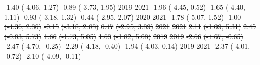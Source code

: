 \documentclass[
  letterpaper,
  DIV=11,
  numbers=noendperiod]{scrartcl}
\providecommand{\DIFdeltex}[1]{{\protect\color{red}\sout{#1}}}                      %
\providecommand{\DIFdelFL}[1]{\DIFdel{#1}} %
\providecommand{\DIFdel}[1]{\texorpdfstring{\DIFdeltex{#1}}{}} %
\begin{document}
\DIFdelFL{-1.40 }%
\DIFdelFL{(-4.06, 1.27) }%
\DIFdelFL{-0.89 }%
\DIFdelFL{(-3.73, 1.95)}%
\DIFdelFL{\hspace{1em}2019 }%
\DIFdelFL{2021 }%
\DIFdelFL{-1.96 }%
\DIFdelFL{(-4.45, 0.52) }%
\DIFdelFL{-1.65 }%
\DIFdelFL{(-4.40, 1.11) }%
\DIFdelFL{-0.93 }%
\DIFdelFL{(-3.18, 1.32) }%
\DIFdelFL{-0.44 }%
\DIFdelFL{(-2.95, 2.07)}%
\DIFdelFL{\hspace{1em}2020 }%
\DIFdelFL{2021 }%
\DIFdelFL{-1.78 }%
\DIFdelFL{(-5.07, 1.52) }%
\DIFdelFL{-1.00 }%
\DIFdelFL{(-4.36, 2.36) }%
\DIFdelFL{-0.15 }%
\DIFdelFL{(-3.18, 2.88) }%
\DIFdelFL{0.47 }%
\DIFdelFL{(-2.95, 3.89)}%
\DIFdelFL{\hspace{1em}2021 }%
\DIFdelFL{2021 }%
\DIFdelFL{2.11 }%
\DIFdelFL{(-1.09, 5.31) }%
\DIFdelFL{2.45 }%
\DIFdelFL{(-0.83, 5.73) }%
\DIFdelFL{1.66 }%
\DIFdelFL{(-1.73, 5.05) }%
\DIFdelFL{1.63 }%
\DIFdelFL{(-1.82, 5.08)}%
\DIFdelFL{\hspace{1em}2019 }%
\DIFdelFL{2019 }%
\DIFdelFL{-2.66 }%
\DIFdelFL{(-4.67, -0.65) }%
\DIFdelFL{-2.47 }%
\DIFdelFL{(-4.70, -0.25) }%
\DIFdelFL{-2.29 }%
\DIFdelFL{(-4.18, -0.40) }%
\DIFdelFL{-1.94 }%
\DIFdelFL{(-4.03, 0.14)}%
\DIFdelFL{\hspace{1em}2019 }%
\DIFdelFL{2021 }%
\DIFdelFL{-2.37 }%
\DIFdelFL{(-4.01, -0.72) }%
\DIFdelFL{-2.10 }%
\DIFdelFL{(-4.09, -0.11) }%
\end{document}
